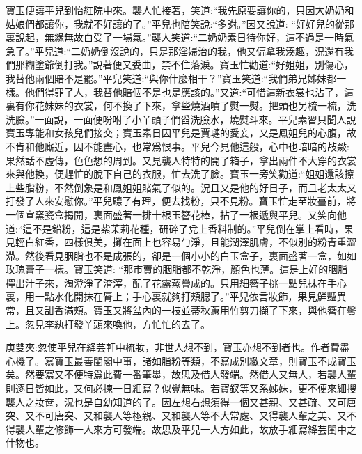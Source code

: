 \begin{parag}
    寶玉便讓平兒到怡紅院中來。襲人忙接著，笑道:“我先原要讓你的，只因大奶奶和姑娘們都讓你，我就不好讓的了。”平兒也陪笑說:“多謝。”因又說道: “好好兒的從那裏說起，無緣無故白受了一場氣。”襲人笑道:“二奶奶素日待你好，這不過是一時氣急了。”平兒道:“二奶奶倒沒說的，只是那淫婦治的我，他又偏拿我湊趣，況還有我們那糊塗爺倒打我。”說著便又委曲，禁不住落淚。寶玉忙勸道:“好姐姐，別傷心，我替他兩個賠不是罷。”平兒笑道:“與你什麼相干？”寶玉笑道:“我們弟兄姊妹都一樣。他們得罪了人，我替他賠個不是也是應該的。”又道:“可惜這新衣裳也沾了，這裏有你花妹妹的衣裳，何不換了下來，拿些燒酒噴了熨一熨。把頭也另梳一梳，洗洗臉。”一面說，一面便吩咐了小丫頭子們舀洗臉水，燒熨斗來。平兒素習只聞人說寶玉專能和女孩兒們接交；寶玉素日因平兒是賈璉的愛妾，又是鳳姐兒的心腹，故不肯和他廝近，因不能盡心，也常爲恨事。平兒今見他這般，心中也暗暗的敁敠:果然話不虛傳，色色想的周到。又見襲人特特的開了箱子，拿出兩件不大穿的衣裳來與他換，便趕忙的脫下自己的衣服，忙去洗了臉。寶玉一旁笑勸道:“姐姐還該擦上些脂粉，不然倒象是和鳳姐姐賭氣了似的。況且又是他的好日子，而且老太太又打發了人來安慰你。”平兒聽了有理，便去找粉，只不見粉。寶玉忙走至妝臺前，將一個宣窯瓷盒揭開，裏面盛著一排十根玉簪花棒，拈了一根遞與平兒。又笑向他道:“這不是鉛粉，這是紫茉莉花種，研碎了兌上香料制的。”平兒倒在掌上看時，果見輕白紅香，四樣俱美，攤在面上也容易勻淨，且能潤澤肌膚，不似別的粉青重澀滯。然後看見胭脂也不是成張的，卻是一個小小的白玉盒子，裏面盛著一盒，如如玫瑰膏子一樣。寶玉笑道: “那市賣的胭脂都不乾淨，顏色也薄。這是上好的胭脂擰出汁子來，淘澄淨了渣滓，配了花露蒸疊成的。只用細簪子挑一點兒抹在手心裏，用一點水化開抹在脣上；手心裏就夠打頰腮了。”平兒依言妝飾，果見鮮豔異常，且又甜香滿頰。寶玉又將盆內的一枝並蒂秋蕙用竹剪刀擷了下來，與他簪在鬢上。忽見李紈打發丫頭來喚他，方忙忙的去了。\begin{note}庚雙夾:忽使平兒在絳芸軒中梳妝，非世人想不到，寶玉亦想不到者也。作者費盡心機了。寫寶玉最善閨閣中事，諸如脂粉等類，不寫成別緻文章，則寶玉不成寶玉矣。然要寫又不便特爲此費一番筆墨，故思及借人發端。然借人又無人，若襲人輩則逐日皆如此，又何必揀一日細寫？似覺無味。若寶釵等又系姊妹，更不便來細搜襲人之妝奩，況也是自幼知道的了。因左想右想須得一個又甚親、又甚疏、又可唐突、又不可唐突、又和襲人等極親、又和襲人等不大常處、又得襲人輩之美、又不得襲人輩之修飾一人來方可發端。故思及平兒一人方如此，故放手細寫絳芸閨中之什物也。\end{note}
\end{parag}


